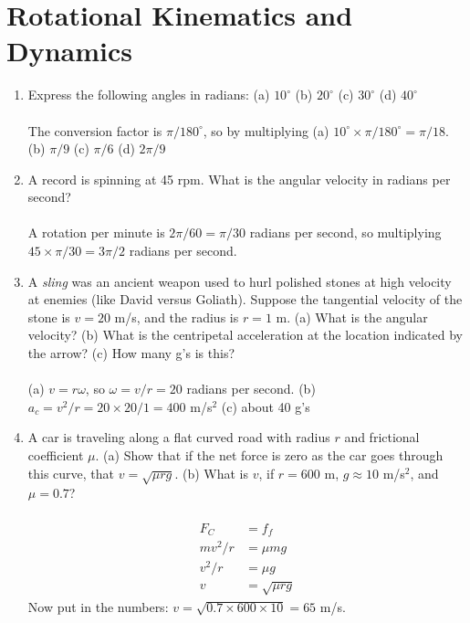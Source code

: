 \documentclass[10pt]{article}
\begin{document}
\maketitle
\small
\section{Rotational Kinematics and Dynamics}
\begin{enumerate}
\item Express the following angles in radians: (a) $10^{\circ}$ (b) $20^{\circ}$ (c) $30^{\circ}$ (d) $40^{\circ}$ \\ \\
The conversion factor is $\pi/180^{\circ}$, so by multiplying (a) $10^{\circ} \times \pi/180^{\circ} = \pi/18$.  (b) $\pi/9$ (c) $\pi/6$ (d) $2\pi/9$ \\
\item A record is spinning at 45 rpm.  What is the angular velocity in radians per second? \\ \\
A rotation per minute is $2\pi/60 = \pi/30$ radians per second, so multiplying $45 \times \pi/30 = 3\pi /2$ radians per second.
\item A \textit{sling} was an ancient weapon used to hurl polished stones at high velocity at enemies (like David versus Goliath).  Suppose the tangential velocity of the stone is $v=20$ m/s, and the radius is $r=1$ m.  (a) What is the angular velocity? (b) What is the centripetal acceleration at the location indicated by the arrow? (c) How many g's is this? \\ \\
(a) $v = r\omega$, so $\omega = v/r = 20$ radians per second.  (b) $a_c = v^2/r = 20 \times 20 / 1 = 400$ m/s$^2$ (c) about 40 g's
\item A car is traveling along a flat curved road with radius $r$ and frictional coefficient $\mu$.  (a) Show that if the net force is zero as the car goes through this curve, that $v = \sqrt{\mu rg}$. (b) What is $v$, if $r=600$ m, $g\approx 10$ m/s$^2$, and $\mu = 0.7$? \\ \\
\begin{align}
F_C &= f_f \\
m v^2/r &= \mu m g \\
v^2/r &= \mu g \\
v &= \sqrt{\mu r g}
\end{align}
Now put in the numbers: $v = \sqrt{0.7 \times 600 \times 10} = 65$ m/s.
\end{enumerate}
\end{document}
